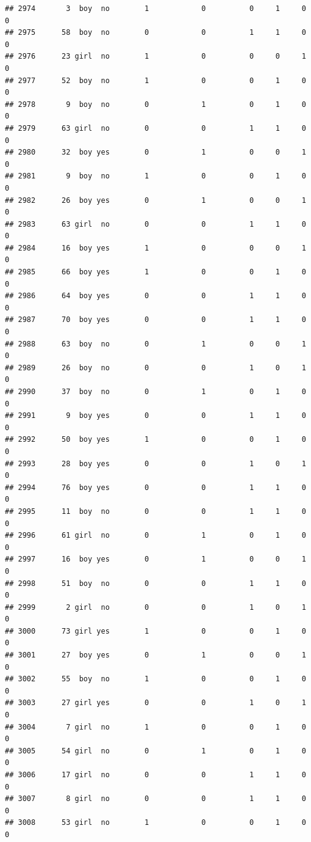 \documentclass[man]{apa6}
\begin{document}
\begin{verbatim}
## 2974       3  boy  no        1            0          0     1     0     0
## 2975      58  boy  no        0            0          1     1     0     0
## 2976      23 girl  no        1            0          0     0     1     0
## 2977      52  boy  no        1            0          0     1     0     0
## 2978       9  boy  no        0            1          0     1     0     0
## 2979      63 girl  no        0            0          1     1     0     0
## 2980      32  boy yes        0            1          0     0     1     0
## 2981       9  boy  no        1            0          0     1     0     0
## 2982      26  boy yes        0            1          0     0     1     0
## 2983      63 girl  no        0            0          1     1     0     0
## 2984      16  boy yes        1            0          0     0     1     0
## 2985      66  boy yes        1            0          0     1     0     0
## 2986      64  boy yes        0            0          1     1     0     0
## 2987      70  boy yes        0            0          1     1     0     0
## 2988      63  boy  no        0            1          0     0     1     0
## 2989      26  boy  no        0            0          1     0     1     0
## 2990      37  boy  no        0            1          0     1     0     0
## 2991       9  boy yes        0            0          1     1     0     0
## 2992      50  boy yes        1            0          0     1     0     0
## 2993      28  boy yes        0            0          1     0     1     0
## 2994      76  boy yes        0            0          1     1     0     0
## 2995      11  boy  no        0            0          1     1     0     0
## 2996      61 girl  no        0            1          0     1     0     0
## 2997      16  boy yes        0            1          0     0     1     0
## 2998      51  boy  no        0            0          1     1     0     0
## 2999       2 girl  no        0            0          1     0     1     0
## 3000      73 girl yes        1            0          0     1     0     0
## 3001      27  boy yes        0            1          0     0     1     0
## 3002      55  boy  no        1            0          0     1     0     0
## 3003      27 girl yes        0            0          1     0     1     0
## 3004       7 girl  no        1            0          0     1     0     0
## 3005      54 girl  no        0            1          0     1     0     0
## 3006      17 girl  no        0            0          1     1     0     0
## 3007       8 girl  no        0            0          1     1     0     0
## 3008      53 girl  no        1            0          0     1     0     0

\end{verbatim}
\end{document}
